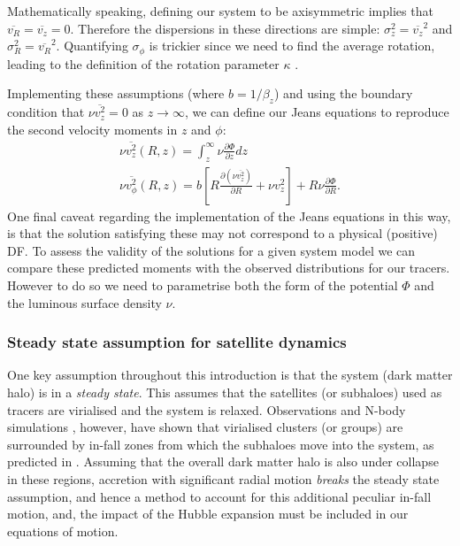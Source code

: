 Mathematically speaking, defining our system to be axisymmetric implies that $\overline{v_{R}} = \overline{v_{z}} = 0$. Therefore the dispersions in these directions are simple: $\sigma_{z}^2 = \overline{v_z}^2$ and $\sigma_{R}^2 = \overline{v_R}^2$. Quantifying $\sigma_{\phi}$ is trickier since we need to find the average rotation, leading to the definition of the rotation parameter $\kappa$ . 

Implementing these assumptions (where $b = 1/\beta_z$) and using the boundary condition that $\nu \overline{v_z^2} = 0$ as $z \to \infty$, we can define our Jeans equations to reproduce the second velocity moments in $z$ and $\phi$:
\begin{eqnarray} \label{jeans1}
\nu \overline{v_z^2}(R,z) = \int^{\infty}_{z} \nu \frac{\partial \Phi}{\partial z} dz \\
\nu \overline{v_{\phi}^2}(R,z) = b \left[ R \frac{\partial (\nu \overline{v_z^2})}{\partial R} + \nu v_{z}^2\right] + R\nu \frac{\partial \Phi}{\partial R} . \label{jeans2}
\end{eqnarray}
One final caveat regarding the implementation of the Jeans equations in this way, is that the solution satisfying these may not correspond to a physical (positive) DF. To assess the validity of the solutions for a given system model we can compare these predicted moments with the observed distributions for our tracers. However to do so we need to parametrise both the form of the potential $\Phi$ and the luminous surface density $\nu$.

\subsubsection{Steady state assumption for satellite dynamics}
One key assumption throughout this introduction is that the system (dark matter halo) is in a \textit{steady state}. This assumes that the satellites (or subhaloes) used as tracers are virialised and the system is relaxed. Observations \citep[e.g.][]{mamon2005} and N-body simulations \citep[e.g.][]{mahajan2011}, however, have shown that virialised clusters (or groups) are surrounded by in-fall zones from which the subhaloes move into the system, as predicted in \citet{gunn1972}. Assuming that the overall dark matter halo is also under collapse in these regions, accretion with significant radial motion \textit{breaks} the steady state assumption, and hence a method to account for this additional peculiar in-fall motion, and, the impact of the Hubble expansion must be included in our equations of motion.

